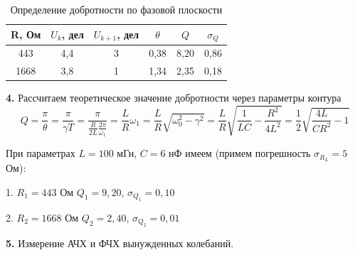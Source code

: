 \documentclass[a4paper, 12pt]{article}
\begin{document}
        \begin{table}[h]
            \centering
            \begin{tabular}{|c|c|c|c|c|c|}
                \hline
                R, Ом & $U_k$, дел & $U_{k + 1}$, дел & $\theta$ & $Q$ & $\sigma_{Q}$  \\ \hline
                443 & 4,4 & 3 & 0,38 & 8,20 & 0,86 \\ \hline
                1668 & 3,8 & 1 & 1,34 & 2,35 & 0,18 \\ \hline
            \end{tabular}
            \caption{Определение добротности по фазовой плоскости}
        \end{table}

        \textbf{4.} Рассчитаем теоретическое значение добротности через параметры контура
        \[Q = \frac{\pi}{\theta} = \frac{\pi}{\gamma T} = \frac{\pi}{\frac{R}{2L}\frac{2\pi}{\omega_1}} = \frac{L}{R}\omega_1 = \frac{L}{R}\sqrt{\omega_0^2 - \gamma^2} = \frac{L}{R}\sqrt{\frac{1}{LC} - \frac{R^2}{4L^2}} = \frac{1}{2}\sqrt{\frac{4L}{CR^2} - 1}\]

        При параметрах $L = 100$ мГн, $C = 6$ нФ имеем (примем погрешность $\sigma_{R_L} = 5$ Ом):

        1. $R_1 = 443$ Ом $Q_1 = 9,20$, $\sigma_{Q_1} = 0,10$

        2. $R_2 = 1668$ Ом $Q_2 = 2,40$, $\sigma_{Q_2} = 0,01$

        \textbf{5.} Измерение АЧХ и ФЧХ вынужденных колебаний.
\end{document}
